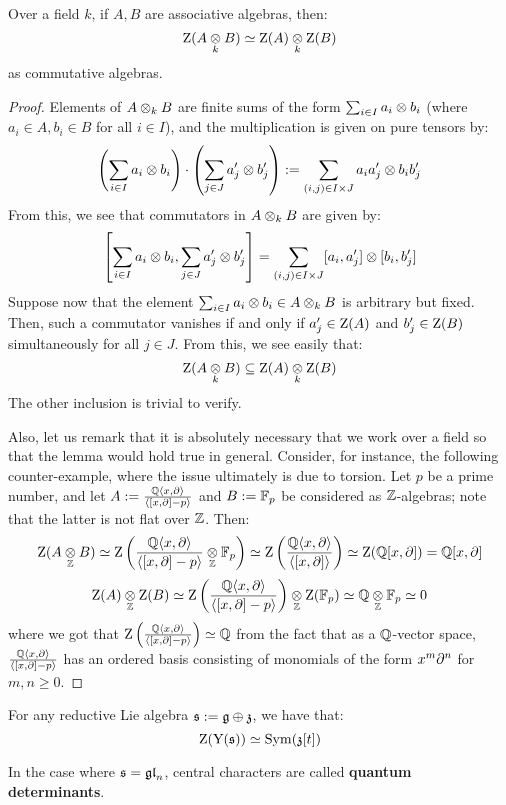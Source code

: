         \begin{lemma} \label{lemma: centres_of_tensor_products_of_algebras}
            Over a field $k$, if $A, B$ are associative algebras, then:
                $$\rmZ(A \tensor_k B) \cong \rmZ(A) \tensor_k \rmZ(B)$$
            as commutative algebras.
        \end{lemma}
            \begin{proof}
                Elements of $A \tensor_k B$ are finite sums of the form $\sum_{i \in I} a_i \tensor b_i$ (where $a_i \in A, b_i \in B$ for all $i \in I$), and the multiplication is given on pure tensors by:
                    $$\left( \sum_{i \in I} a_i \tensor b_i \right) \cdot \left( \sum_{j \in J} a'_j \tensor b'_j \right) := \sum_{(i, j) \in I \x J} a_i a'_j \tensor b_i b'_j$$
                From this, we see that commutators in $A \tensor_k B$ are given by:
                    $$\left[ \sum_{i \in I} a_i \tensor b_i, \sum_{j \in J} a'_j \tensor b'_j \right] = \sum_{(i, j) \in I \x J} [a_i, a'_j] \tensor [b_i, b'_j]$$
                Suppose now that the element $\sum_{i \in I} a_i \tensor b_i \in A \tensor_k B$ is arbitrary but fixed. Then, such a commutator vanishes if and only if $a'_j \in \mathrm{Z}(A)$ and $b'_j \in \mathrm{Z}(B)$ simultaneously for all $j \in J$. From this, we see easily that:
                    $$\rmZ(A \tensor_k B) \subseteq \rmZ(A) \tensor_k \rmZ(B)$$
                The other inclusion is trivial to verify.

                Also, let us remark that it is absolutely necessary that we work over a field so that the lemma would hold true in general. Consider, for instance, the following counter-example, where the issue ultimately is due to torsion. Let $p$ be a prime number, and let $A := \frac{\mathbb{Q}\langle x, \partial\rangle}{\langle[x, \partial] - p\rangle}$ and $B := \mathbb{F}_p$ be considered as $\mathbb{Z}$-algebras; note that the latter is not flat over $\mathbb{Z}$. Then:
                    $$\rmZ(A \tensor_{\Z} B) \cong \rmZ\left( \frac{\Q\<x, \del\>}{\<[x, \del] - p\>} \tensor_{\Z} \F_p \right) \cong \rmZ\left( \frac{\Q\<x, \del\>}{\<[x, \del]\>} \right) \cong \rmZ(\Q[x, \del]) = \Q[x, \del]$$
                    $$\rmZ(A) \tensor_{\Z} \rmZ(B) \cong \rmZ\left( \frac{\Q\<x, \del\>}{\<[x, \del] - p\>} \right) \tensor_{\Z} \rmZ(\F_p) \cong \Q \tensor_{\Z} \F_p \cong 0$$
                where we got that $\mathrm{Z}\left( \frac{\mathbb{Q}\langle x, \partial\rangle}{\langle[x, \partial] - p\rangle} \right) \simeq \mathbb{Q}$ from the fact that as a $\mathbb{Q}$-vector space, $\frac{\mathbb{Q}\langle x, \partial\rangle}{\langle[x, \partial] - p\rangle}$ has an ordered basis consisting of monomials of the form $x^m \partial^n$ for $m, n \geq 0$.
            \end{proof}
        \begin{corollary}
            For any reductive Lie algebra $\mathfrak{s} := \mathfrak{g} \oplus \mathfrak{z}$, we have that:
                $$\mathrm{Z}( \mathrm{Y}(\mathfrak{s}) ) \simeq \mathrm{Sym}(\mathfrak{z}[t])$$
        \end{corollary}
            
        \begin{definition} \label{def: quantum_determinants}
            In the case where $\mathfrak{s} = \mathfrak{gl}_n$, central characters are called \textbf{quantum determinants}.
        \end{definition}
